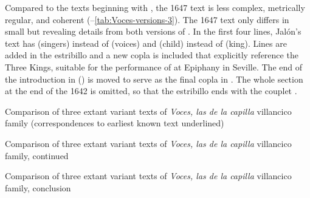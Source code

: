 Compared to the texts beginning with , the 1647 text
 is less complex, metrically regular, and
coherent 
(--\ref{tab:Voces-versions-3}).
The 1647  text only differs in small but revealing details
from both versions of .
In the first four lines, Jalón's text has  (singers) instead
of  (voices) and  (child) instead of 
(king).
Lines are added in the estribillo and a new copla is included that explicitly
reference the Three Kings, suitable for the performance of  at
Epiphany in Seville.
The end of the introduction in  () is moved to serve as the final copla in .
The whole  section at the end of the 1642  is omitted,
so that the estribillo ends with the couplet .

{Comparison of three extant variant texts of \emph{Voces, las de la capilla}
villancico family (correspondences to earliest known text underlined)}

{Comparison of three extant variant texts of \emph{Voces, las de la capilla}
villancico family, continued}

{Comparison of three extant variant texts of \emph{Voces, las de la capilla}
villancico family, conclusion}

